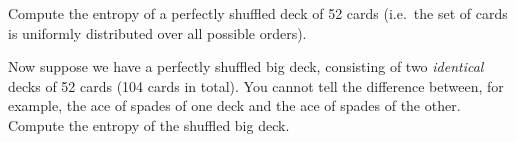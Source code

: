 \documentclass[a4paper,10pt,landscape,twocolumn]{scrartcl}
\begin{document}
\begin{exercise}
	\begin{subex}
	Compute the entropy of a perfectly shuffled deck of 52 cards (i.e.\ the set of cards is uniformly distributed over all possible orders).
	\end{subex}
	
	\begin{subex}
	Now suppose we have a perfectly shuffled big deck, consisting of two \emph{identical} decks of 52 cards (104 cards in total). You cannot tell the difference between, for example, the ace of spades of one deck and the ace of spades of the other. Compute the entropy of the shuffled big deck.
	\end{subex}
\end{exercise}
\end{document}
